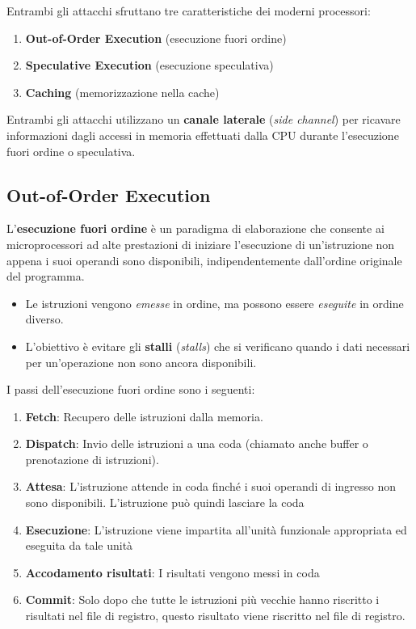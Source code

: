 \documentclass{article}
\begin{document}
Entrambi gli attacchi sfruttano tre caratteristiche dei moderni processori:

\begin{enumerate}
    \item \textbf{Out-of-Order Execution} (esecuzione fuori ordine)
    \item \textbf{Speculative Execution} (esecuzione speculativa)
    \item \textbf{Caching} (memorizzazione nella cache)
\end{enumerate}

Entrambi gli attacchi utilizzano un \textbf{canale laterale} (\textit{side channel}) per ricavare informazioni dagli accessi in memoria effettuati dalla CPU durante l'esecuzione fuori ordine o speculativa.

\subsection*{Out-of-Order Execution}

L'\textbf{esecuzione fuori ordine} è un paradigma di elaborazione che consente ai microprocessori ad alte prestazioni di iniziare l'esecuzione di un'istruzione non appena i suoi operandi sono disponibili, indipendentemente dall'ordine originale del programma.

\begin{itemize}
    \item Le istruzioni vengono \textit{emesse} in ordine, ma possono essere \textit{eseguite} in ordine diverso.
    \item L'obiettivo è evitare gli \textbf{stalli} (\textit{stalls}) che si verificano quando i dati necessari per un'operazione non sono ancora disponibili.
\end{itemize}

I passi dell'esecuzione fuori ordine sono i seguenti:

\begin{enumerate}
    \item \textbf{Fetch}:  Recupero delle istruzioni dalla memoria.
    \item \textbf{Dispatch}: Invio delle istruzioni a una coda (chiamato anche buffer o prenotazione di istruzioni).
    \item \textbf{Attesa}:  L'istruzione attende in coda finché i suoi operandi di ingresso non sono disponibili. L'istruzione 
può quindi lasciare la coda
    \item \textbf{Esecuzione}:  L'istruzione viene impartita all'unità funzionale appropriata ed eseguita da tale unità
    \item \textbf{Accodamento risultati}:  I risultati vengono messi in coda
    \item \textbf{Commit}: Solo dopo che tutte le istruzioni più vecchie hanno riscritto i risultati nel file di registro, questo 
risultato viene riscritto nel file di registro.
\end{enumerate}
\end{document}
